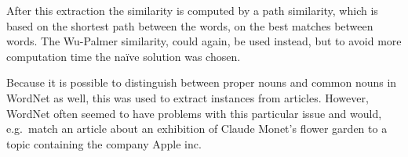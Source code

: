 After this extraction the similarity is computed by a path similarity, which is based on the shortest path between the words, on the best matches between words. The Wu-Palmer similarity, could again, be used instead, but to avoid more computation time the naïve solution was chosen.

Because it is possible to distinguish between proper nouns and common nouns in WordNet as well, this was used to extract instances from articles. However, WordNet often seemed to have problems with this particular issue and would, e.g.\ match an article about an exhibition of Claude Monet's flower garden to a topic containing the company Apple inc.
\begin{figure}[h!tp]
	\myfloatalign
	\\
\end{figure}

